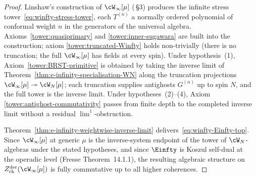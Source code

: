 \begin{proof}
\label{rem:e-infinity-specialisation-Winfty-evidence}
Linshaw's construction of $\cW_\infty[\mu]$
\textup{(}\cite{Linshaw-Winfty}\,§3\textup{)} produces the infinite
stress tower~\eqref{eq:winfty-stress-tower}, each $T^{(n)}$ a
normally ordered polynomial of conformal weight $n$ in the generators
of the universal algebra. Axioms~\ref{tower:quasiprimary} and
\ref{tower:inner-sugawara} are built into the construction; axiom
\ref{tower:truncated-Winfty} holds non-trivially (there is no
truncation; the full $\cW_\infty[\mu]$ has fields at every
spin). Under hypothesis~(1), Axiom~\ref{tower:BRST-primitive} is
obtained by taking the inverse limit of
Theorem~\ref{thm:e-infinity-specialisation-WN} along the truncation
projections $\cW_\infty[\mu] \twoheadrightarrow \cW_N[\mu]$; each
truncation supplies antighosts $G^{(n)}$ up to spin $N$, and the full
tower is the inverse limit. Under hypotheses~(2)--(4), Axiom
\ref{tower:antighost-commutativity} passes from finite depth to the
completed inverse limit without a residual \(\lim^1\)-obstruction.

Theorem~\ref{thm:e-infinity-weightwise-inverse-limit}
delivers~\eqref{eq:winfty-Einfty-top}. Since $\cW_\infty[\mu]$ at
generic $\mu$ is the inverse-system endpoint of the tower of
$\cW_N$-algebras under the stated hypotheses, and since $\Einfty$ is
Koszul self-dual at the operadic level
(Fresse\,\cite{Fresse-book}\,Theorem~14.1.1), the resulting algebraic
structure on $Z^{\mathrm{der}}_{\mathrm{ch}}(\cW_\infty[\mu])$ is fully
commutative up to all higher coherences.
\end{proof}


